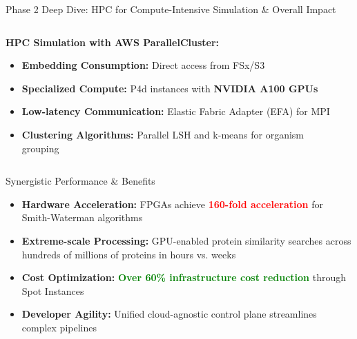 \documentclass[aspectratio=169]{beamer}
\begin{document}
\begin{frame}{Phase 2 Deep Dive: HPC for Compute-Intensive Simulation \& Overall Impact}
    \begin{columns}
        \begin{column}{0.6\textwidth}
            \textbf{HPC Simulation with AWS ParallelCluster:}
            \begin{itemize}
                \item \textbf{Embedding Consumption:} Direct access from FSx/S3
                \item \textbf{Specialized Compute:} P4d instances with \textcolor{awsorange}{\textbf{NVIDIA A100 GPUs}}
                \item \textbf{Low-latency Communication:} Elastic Fabric Adapter (EFA) for MPI
                \item \textbf{Clustering Algorithms:} Parallel LSH and k-means for organism grouping
            \end{itemize}
        \end{column}
        \begin{column}{0.4\textwidth}
        \end{column}
    \end{columns}
    
    \vspace{0.3cm}
    \begin{block}{Synergistic Performance \& Benefits}
        \begin{itemize}
            \item \textbf{Hardware Acceleration:} FPGAs achieve \textcolor{red}{\textbf{160-fold acceleration}} for Smith-Waterman algorithms
            \item \textbf{Extreme-scale Processing:} GPU-enabled protein similarity searches across hundreds of millions of proteins in hours vs. weeks
            \item \textbf{Cost Optimization:} \textcolor{green}{\textbf{Over 60\% infrastructure cost reduction}} through Spot Instances
            \item \textbf{Developer Agility:} Unified cloud-agnostic control plane streamlines complex pipelines
        \end{itemize}
    \end{block}
\end{frame}
\end{document}
